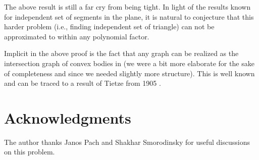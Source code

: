 \documentclass[12pt]{article}
\begin{document}
\bigskip

The above result is still a far cry from being tight. In light of the
results known \cite{am-isigc-06} for independent set of segments in
the plane, it is natural to conjecture that this harder problem (i.e.,
finding independent set of triangle) can not be approximated to within
any polynomial factor.

Implicit in the above proof is the fact that any graph can be realized
as the intersection graph of convex bodies in  (we were a bit
more elaborate for the sake of completeness and since we needed
slightly more structure). This is well known and can be traced to a
result of Tietze from 1905 \cite{t-upnr-05}.







\section*{Acknowledgments}

The author thanks Janos Pach and Shakhar Smorodinsky for useful
discussions on this problem.




 

\end{document}

